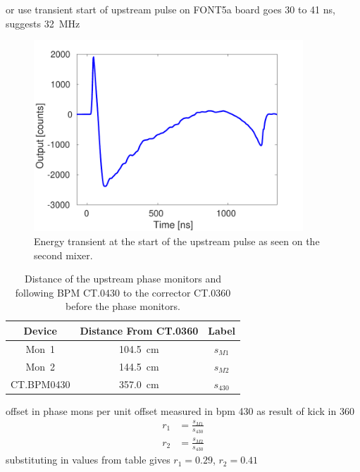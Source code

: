 or use transient start of upstream pulse
on FONT5a board goes 30 to 41 ns, suggests 32~MHz

\begin{figure}
  \centering
  \includegraphics[width=0.9\textwidth]{Figures/phaseMons/transientUpstream}
  \caption{Energy transient at the start of the upstream pulse as seen on the second mixer.}
  \label{f:transientUpstream}
\end{figure}




\begin{table}
  \begin{center}
    \begin{tabular}{|c c c|}
	   \hline
       Device & Distance From CT.0360 & Label\\ \hline
       Mon~1 & 104.5~cm & \(s_{M1}\)\\ 
       Mon~2 & 144.5~cm & \(s_{M2}\)\\
       CT.BPM0430 & 357.0~cm & \(s_{430}\) \\ \hline
    \end{tabular}
    \caption{Distance of the upstream phase monitors and following BPM CT.0430 to the corrector CT.0360 before the phase monitors.}
  	\label{t:distanceFromCT360}
  \end{center}
\end{table}

offset in phase mons per unit offset measured in bpm 430 as result of kick in 360
\begin{align}
r_1 &= \frac{s_{M1}}{s_{430}} \\
r_2 &= \frac{s_{M2}}{s_{430}}
\end{align}
substituting in values from table gives \(r_1 = 0.29\), \(r_2 = 0.41\)

